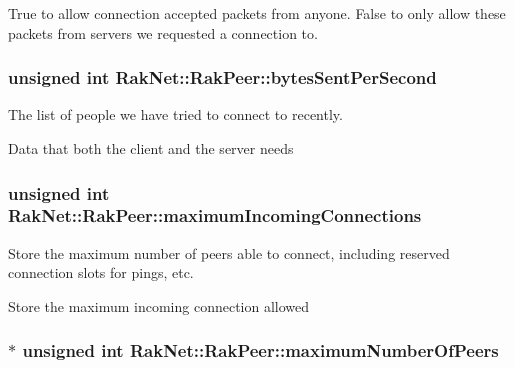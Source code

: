 True to allow connection accepted packets from anyone. False to only allow these packets from servers we requested a connection to. \hypertarget{class_rak_net_1_1_rak_peer_a031ec9044cab71ff6f0ecc3b60e21b76}{
\subsubsection[{bytes\-Sent\-Per\-Second}]{\setlength{\rightskip}{0pt plus 5cm}unsigned int Rak\-Net\-::\-Rak\-Peer\-::bytes\-Sent\-Per\-Second\hspace{0.3cm}{\ttfamily [protected]}}}\label{class_rak_net_1_1_rak_peer_a031ec9044cab71ff6f0ecc3b60e21b76}


The list of people we have tried to connect to recently. 

Data that both the client and the server needs \hypertarget{class_rak_net_1_1_rak_peer_a6244b23254ae6e95302b5060b3f1bc0e}{
\subsubsection[{maximum\-Incoming\-Connections}]{\setlength{\rightskip}{0pt plus 5cm}unsigned int Rak\-Net\-::\-Rak\-Peer\-::maximum\-Incoming\-Connections\hspace{0.3cm}{\ttfamily [protected]}}}\label{class_rak_net_1_1_rak_peer_a6244b23254ae6e95302b5060b3f1bc0e}


Store the maximum number of peers able to connect, including reserved connection slots for pings, etc. 

Store the maximum incoming connection allowed \hypertarget{class_rak_net_1_1_rak_peer_a9faf5bd4ea7dca603f967b6ee1ed40d9}{
\subsubsection[{maximum\-Number\-Of\-Peers}]{\setlength{\rightskip}{0pt plus 5cm}$\ast$ unsigned int Rak\-Net\-::\-Rak\-Peer\-::maximum\-Number\-Of\-Peers\hspace{0.3cm}{\ttfamily [protected]}}}\label{class_rak_net_1_1_rak_peer_a9faf5bd4ea7dca603f967b6ee1ed40d9}


